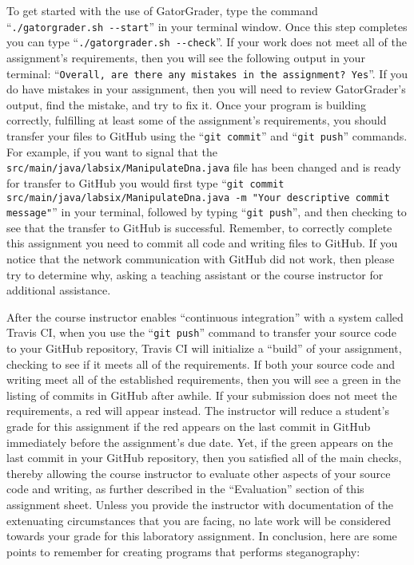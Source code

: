 \documentclass[11pt]{article}
\newcommand{\mainprogramsource}{\lstinline{src/main/java/labsix/ManipulateDna.java}}
\newcommand{\gatorgraderstart}{\command{./gatorgrader.sh --start}}
\newcommand{\gatorgradercheck}{\command{./gatorgrader.sh --check}}
\newcommand{\gitcommit}{\command{git commit}}
\newcommand{\gitpush}{\command{git push}}
\newcommand{\gitcommitmainprogram}{\command{git commit src/main/java/labsix/ManipulateDna.java -m "Your
descriptive commit message"}}
\newcommand{\command}[1]{``\lstinline{#1}''}
\newcommand{\step}[1]{``{#1}''}
\newcommand{\checkmark}{\ding{51}}
\newcommand{\naughtmark}{\ding{55}}
\begin{document}
To get started with the use of GatorGrader, type the command \gatorgraderstart{} in your terminal window. Once this step
completes you can type \gatorgradercheck{}. If your work does not meet all of the assignment's requirements, then you
will see the following output in your terminal: \command{Overall, are there any mistakes in the assignment? Yes}. If you
do have mistakes in your assignment, then you will need to review GatorGrader's output, find the mistake, and try to fix
it. Once your program is building correctly, fulfilling at least some of the assignment's requirements, you should
transfer your files to GitHub using the \gitcommit{} and \gitpush{} commands. For example, if you want to signal that
the \mainprogramsource{} file has been changed and is ready for transfer to GitHub you would first type
\gitcommitmainprogram{} in your terminal, followed by typing \gitpush{}, and then checking to see that the transfer to
GitHub is successful. Remember, to correctly complete this assignment you need to commit all code and writing files to
GitHub. If you notice that the network communication with GitHub did not work, then please try to determine why, asking
a teaching assistant or the course instructor for additional assistance.

After the course instructor enables \step{continuous integration} with a system called Travis CI, when you use the
\gitpush{} command to transfer your source code to your GitHub repository, Travis CI will initialize a \step{build} of
your assignment, checking to see if it meets all of the requirements. If both your source code and writing meet all of
the established requirements, then you will see a green \checkmark{} in the listing of commits in GitHub after awhile.
If your submission does not meet the requirements, a red \naughtmark{} will appear instead. The instructor will reduce a
student's grade for this assignment if the red \naughtmark{} appears on the last commit in GitHub immediately before the
assignment's due date. Yet, if the green \checkmark{} appears on the last commit in your GitHub repository, then you
satisfied all of the main checks, thereby allowing the course instructor to evaluate other aspects of your source code
and writing, as further described in the \step{Evaluation} section of this assignment sheet. Unless you provide the
instructor with documentation of the extenuating circumstances that you are facing, no late work will be considered
towards your grade for this laboratory assignment. In conclusion, here are some points to remember for creating programs
that performs steganography:
\end{document}
